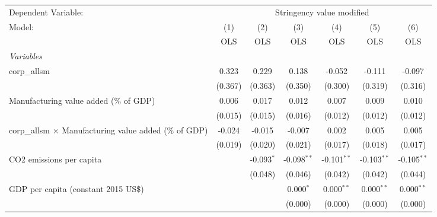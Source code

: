 
\begingroup
\centering
\begin{tabular}{lcccccc}
   \toprule
   Dependent Variable: & \multicolumn{6}{c}{Stringency value modified}\\
   Model:                                                        & (1)     & (2)          & (3)           & (4)           & (5)           & (6)\\  
                                                                 &  OLS    & OLS          & OLS           & OLS           & OLS           & OLS\\  
   \midrule
   \emph{Variables}\\
   corp\_allsm                                                   & 0.323   & 0.229        & 0.138         & -0.052        & -0.111        & -0.097\\   
                                                                 & (0.367) & (0.363)      & (0.350)       & (0.300)       & (0.319)       & (0.316)\\   
   Manufacturing value added (\% of GDP)                         & 0.006   & 0.017        & 0.012         & 0.007         & 0.009         & 0.010\\   
                                                                 & (0.015) & (0.015)      & (0.016)       & (0.012)       & (0.012)       & (0.012)\\   
   corp\_allsm $\times$ Manufacturing value added (\% of GDP)    & -0.024  & -0.015       & -0.007        & 0.002         & 0.005         & 0.005\\   
                                                                 & (0.019) & (0.020)      & (0.021)       & (0.017)       & (0.018)       & (0.017)\\   
   CO2 emissions per capita                                      &         & -0.093$^{*}$ & -0.098$^{**}$ & -0.101$^{**}$ & -0.103$^{**}$ & -0.105$^{**}$\\   
                                                                 &         & (0.048)      & (0.046)       & (0.042)       & (0.042)       & (0.044)\\   
   GDP per capita (constant 2015 US\$)                           &         &              & 0.000$^{*}$   & 0.000$^{**}$  & 0.000$^{**}$  & 0.000$^{**}$\\   
                                                                 &         &              & (0.000)       & (0.000)       & (0.000)       & (0.000)\\   

\end{tabular}
